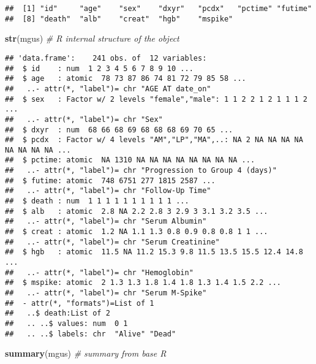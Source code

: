 \documentclass[]{book}
\newenvironment{Shaded}{\begin{snugshade}}{\end{snugshade}}
\newcommand{\KeywordTok}[1]{\textcolor[rgb]{0.13,0.29,0.53}{\textbf{{#1}}}}
\newcommand{\CommentTok}[1]{\textcolor[rgb]{0.56,0.35,0.01}{\textit{{#1}}}}
\newcommand{\NormalTok}[1]{{#1}}
\theoremstyle{definition}
\theoremstyle{definition}
\theoremstyle{definition}
\theoremstyle{remark}
\begin{document}
\begin{verbatim}
##  [1] "id"     "age"    "sex"    "dxyr"   "pcdx"   "pctime" "futime"
##  [8] "death"  "alb"    "creat"  "hgb"    "mspike"
\end{verbatim}

\begin{Shaded}
\begin{Highlighting}[]
\KeywordTok{str}\NormalTok{(mgus)                                   }\CommentTok{# R internal structure of the object}
\end{Highlighting}
\end{Shaded}

\begin{verbatim}
## 'data.frame':    241 obs. of  12 variables:
##  $ id    : num  1 2 3 4 5 6 7 8 9 10 ...
##  $ age   : atomic  78 73 87 86 74 81 72 79 85 58 ...
##   ..- attr(*, "label")= chr "AGE AT date_on"
##  $ sex   : Factor w/ 2 levels "female","male": 1 1 2 2 1 2 1 1 1 2 ...
##   ..- attr(*, "label")= chr "Sex"
##  $ dxyr  : num  68 66 68 69 68 68 68 69 70 65 ...
##  $ pcdx  : Factor w/ 4 levels "AM","LP","MA",..: NA 2 NA NA NA NA NA NA NA NA ...
##  $ pctime: atomic  NA 1310 NA NA NA NA NA NA NA NA ...
##   ..- attr(*, "label")= chr "Progression to Group 4 (days)"
##  $ futime: atomic  748 6751 277 1815 2587 ...
##   ..- attr(*, "label")= chr "Follow-Up Time"
##  $ death : num  1 1 1 1 1 1 1 1 1 1 ...
##  $ alb   : atomic  2.8 NA 2.2 2.8 3 2.9 3 3.1 3.2 3.5 ...
##   ..- attr(*, "label")= chr "Serum Albumin"
##  $ creat : atomic  1.2 NA 1.1 1.3 0.8 0.9 0.8 0.8 1 1 ...
##   ..- attr(*, "label")= chr "Serum Creatinine"
##  $ hgb   : atomic  11.5 NA 11.2 15.3 9.8 11.5 13.5 15.5 12.4 14.8 ...
##   ..- attr(*, "label")= chr "Hemoglobin"
##  $ mspike: atomic  2 1.3 1.3 1.8 1.4 1.8 1.3 1.4 1.5 2.2 ...
##   ..- attr(*, "label")= chr "Serum M-Spike"
##  - attr(*, "formats")=List of 1
##   ..$ death:List of 2
##   .. ..$ values: num  0 1
##   .. ..$ labels: chr  "Alive" "Dead"
\end{verbatim}

\begin{Shaded}
\begin{Highlighting}[]
\KeywordTok{summary}\NormalTok{(mgus)                                              }\CommentTok{# summary from base R}
\end{Highlighting}
\end{Shaded}
\end{document}
